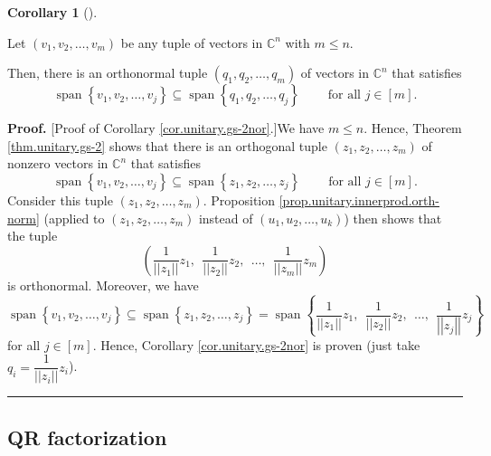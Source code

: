 \documentclass[numbers=enddot,12pt,final,onecolumn,notitlepage]{scrartcl}%
\numberwithin{exer}{subsection}
\theoremstyle{definition}
\newtheorem{coro}[theo]{Corollary}
\newenvironment{corollary}[1][]
{\begin{coro}[#1]\begin{leftbar}}
{\end{leftbar}\end{coro}}
\newenvironment{proof}[1][Proof]{\noindent\textbf{#1.} }{\ \rule{0.5em}{0.5em}}
\begin{document}
\begin{corollary}
\label{cor.unitary.gs-2nor}Let $\left(  v_{1},v_{2},\ldots,v_{m}\right)  $ be
any tuple of vectors in $\mathbb{C}^{n}$ with $m\leq n$.

Then, there is an orthonormal tuple $\left(  q_{1},q_{2},\ldots,q_{m}\right)
$ of vectors in $\mathbb{C}^{n}$ that satisfies%
\[
\operatorname*{span}\left\{  v_{1},v_{2},\ldots,v_{j}\right\}  \subseteq
\operatorname*{span}\left\{  q_{1},q_{2},\ldots,q_{j}\right\}
\ \ \ \ \ \ \ \ \ \ \text{for all }j\in\left[  m\right]  .
\]

\end{corollary}

\begin{proof}
[Proof of Corollary \ref{cor.unitary.gs-2nor}.]We have $m\leq n$. Hence,
Theorem \ref{thm.unitary.gs-2} shows that there is an orthogonal tuple
$\left(  z_{1},z_{2},\ldots,z_{m}\right)  $ of nonzero vectors in
$\mathbb{C}^{n}$ that satisfies%
\[
\operatorname*{span}\left\{  v_{1},v_{2},\ldots,v_{j}\right\}  \subseteq
\operatorname*{span}\left\{  z_{1},z_{2},\ldots,z_{j}\right\}
\ \ \ \ \ \ \ \ \ \ \text{for all }j\in\left[  m\right]  .
\]
Consider this tuple $\left(  z_{1},z_{2},\ldots,z_{m}\right)  $. Proposition
\ref{prop.unitary.innerprod.orth-norm} (applied to $\left(  z_{1},z_{2}%
,\ldots,z_{m}\right)  $ instead of $\left(  u_{1},u_{2},\ldots,u_{k}\right)
$) then shows that the tuple%
\[
\left(  \dfrac{1}{\left\vert \left\vert z_{1}\right\vert \right\vert }%
z_{1},\ \ \dfrac{1}{\left\vert \left\vert z_{2}\right\vert \right\vert }%
z_{2},\ \ \ldots,\ \ \dfrac{1}{\left\vert \left\vert z_{m}\right\vert
\right\vert }z_{m}\right)
\]
is orthonormal. Moreover, we have
\[
\operatorname*{span}\left\{  v_{1},v_{2},\ldots,v_{j}\right\}  \subseteq
\operatorname*{span}\left\{  z_{1},z_{2},\ldots,z_{j}\right\}
=\operatorname*{span}\left\{  \dfrac{1}{\left\vert \left\vert z_{1}\right\vert
\right\vert }z_{1},\ \ \dfrac{1}{\left\vert \left\vert z_{2}\right\vert
\right\vert }z_{2},\ \ \ldots,\ \ \dfrac{1}{\left\vert \left\vert
z_{j}\right\vert \right\vert }z_{j}\right\}
\]
for all $j\in\left[  m\right]  $. Hence, Corollary \ref{cor.unitary.gs-2nor}
is proven (just take $q_{i}=\dfrac{1}{\left\vert \left\vert z_{i}\right\vert
\right\vert }z_{i}$).
\end{proof}

\subsection{QR factorization}
\end{document}
